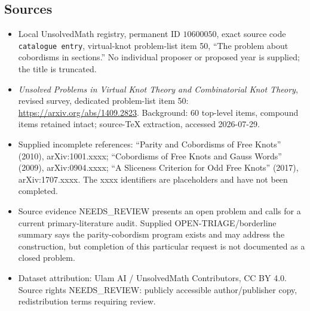 \documentclass[11pt]{article}
\begin{document}
\subsection{Sources}
\begin{itemize}
\item Local UnsolvedMath registry, permanent ID \(10600050\), exact source code \texttt{catalogue entry}, virtual-knot problem-list item 50, ``The problem about cobordisms in sections.'' No individual proposer or proposed year is supplied; the title is truncated.
\item \emph{Unsolved Problems in Virtual Knot Theory and Combinatorial Knot Theory}, revised survey, dedicated problem-list item 50: \url{https://arxiv.org/abs/1409.2823}. Background: 60 top-level items, compound items retained intact; source-TeX extraction, accessed 2026-07-29.
\item Supplied incomplete references: ``Parity and Cobordisms of Free Knots'' (2010), arXiv:1001.xxxx; ``Cobordisms of Free Knots and Gauss Words'' (2009), arXiv:0904.xxxx; ``A Sliceness Criterion for Odd Free Knots'' (2017), arXiv:1707.xxxx. The xxxx identifiers are placeholders and have not been completed.
\item Source evidence NEEDS\_REVIEW presents an open problem and calls for a current primary-literature audit. Supplied OPEN-TRIAGE/borderline summary says the parity-cobordism program exists and may address the construction, but completion of this particular request is not documented as a closed problem.
\item Dataset attribution: Ulam AI / UnsolvedMath Contributors, CC BY 4.0. Source rights NEEDS\_REVIEW: publicly accessible author/publisher copy, redistribution terms requiring review.
\end{itemize}
\end{document}

